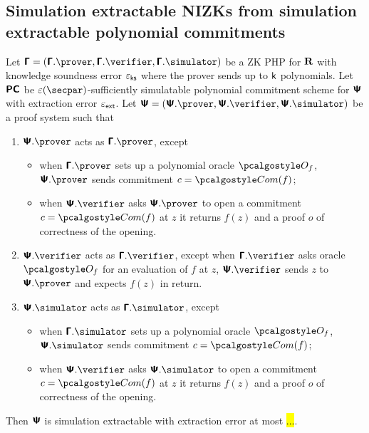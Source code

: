 \documentclass[runningheads,11pt]{llncs}
\begin{document}
\subsection{Simulation extractable NIZKs from simulation extractable polynomial
  commitments}

\begin{theorem}
  Let $\PHP = (\PHP.\prover, \PHP.\verifier, \PHP.\simulator)$ be a ZK PHP
  for $\mathbf{R}$ with knowledge soundness error $\varepsilon_{\mathsf{ks}}$ where the prover sends up
  to $\mathsf{k}$ polynomials. Let $\bm{\mathsf{PC}}$ be $\eps(\secpar)$-sufficiently
  simulatable polynomial commitment scheme for $\bm{\mathsf{\Psi}}$ with extraction error
  $\varepsilon_{\mathsf{ext}}$. Let $\PS = (\PS.\prover, \PS.\verifier, \PS.\simulator)$ be a proof system such
  that
  \begin{enumerate}
  \item $\PS.\prover$ acts as $\PHP.\prover$, except
    \begin{itemize}
    \item when $\PHP.\prover$ sets up a polynomial oracle $\oracleo_f$,
      $\PS.\prover$ sends commitment $c = \com(f)$;
    \item when $\PS.\verifier$ asks $\PS.\prover$ to open a commitment
      $c = \com(f)$ at $z$ it returns $f(z)$ and a proof $o$ of correctness of
      the opening.
  \end{itemize}
  \item $\PS.\verifier$ acts as $\PHP.\verifier$, except when $\PHP.\verifier$
    asks oracle $\oracleo_f$ for an evaluation of $f$ at $z$, $\PS.\verifier$
    sends $z$ to $\PS.\prover$ and expects $f(z)$ in return.
  \item $\PS.\simulator$ acts as $\PHP.\simulator$, except
     \begin{itemize}
    \item when $\PHP.\simulator$ sets up a polynomial oracle $\oracleo_f$,
      $\PS.\simulator$ sends commitment $c = \com(f)$;
    \item when $\PS.\verifier$ asks $\PS.\simulator$ to open a commitment
      $c = \com(f)$ at $z$ it returns $f(z)$ and a proof $o$ of correctness of
      the opening.
  \end{itemize}
  \end{enumerate}
  Then $\bm{\mathsf{\Psi}}$ is simulation extractable with extraction error at most \hl{...}.
\end{theorem}
\end{document}

